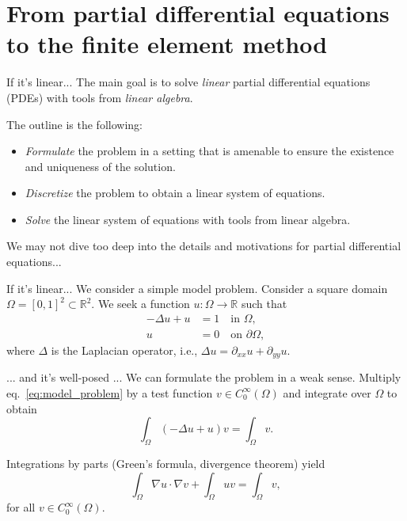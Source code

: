 \documentclass{beamer}
\begin{document}
\section{From partial differential equations to the finite element method}
\begin{frame}{If it's linear...}
    The main goal is to solve \emph{linear} partial differential equations (PDEs) with tools from \emph{linear algebra}.

    \pause

    The outline is the following:
    \begin{itemize}
        \item \emph{Formulate} the problem in a setting that is amenable to ensure the existence and uniqueness of the solution.
        \item \emph{Discretize} the problem to obtain a linear system of equations.
        \item \emph{Solve} the linear system of equations with tools from linear algebra.
    \end{itemize}

    \pause

    We may not dive too deep into the details and motivations for partial differential equations...
\end{frame}


\begin{frame}{If it's linear...}
    We consider a simple model problem.
    Consider a square domain $\Omega = [0,1]^2 \subset \mathbb{R}^2$.
    We seek a function $u: \Omega \to \mathbb{R}$ such that
    \begin{subequations}
        \label{eq:model_problem}
        \begin{align}
            -\Delta u + u &= 1 \quad \text{in } \Omega, \\
            u &= 0 \quad \text{on } \partial \Omega,
        \end{align}
    \end{subequations}
    where $\Delta$ is the Laplacian operator, i.e., $\Delta u = \partial_{xx} u + \partial_{yy} u$.
\end{frame}

\begin{frame}{... and it's well-posed ...}
    We can formulate the problem in a weak sense.
    Multiply eq.~\eqref{eq:model_problem} by a test function $v \in C_0^\infty(\Omega)$ and integrate over $\Omega$ to obtain
    \begin{equation*}
        \int_{\Omega} (-\Delta u + u) v = \int_{\Omega} v.
    \end{equation*}

    \pause

    Integrations by parts (Green's formula, divergence theorem) yield
    \begin{equation}
        \int_{\Omega} \nabla u \cdot \nabla v + \int_{\Omega} uv = \int_{\Omega} v,
    \end{equation}
    for all $v \in C_0^\infty(\Omega)$.
\end{frame}
\end{document}
